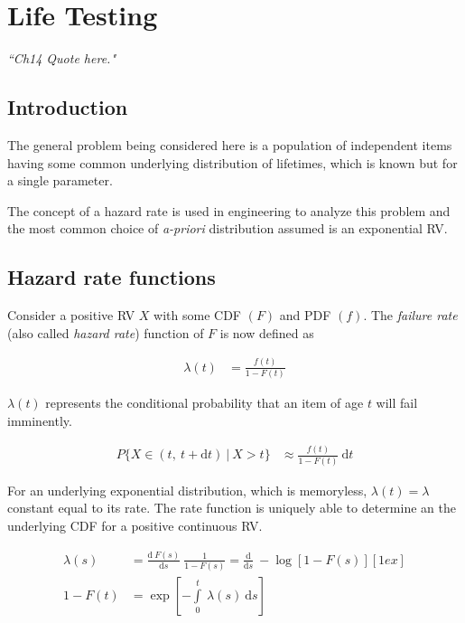 \chapter{Life Testing}


\begin{flushright}
	\textit{``Ch14 Quote here."} \\
\end{flushright}

\section{Introduction}

The general problem being considered here is a population of independent items having some common underlying distribution of lifetimes, which is known but for a single parameter.

The concept of a hazard rate is used in engineering to analyze this problem and the most common choice of \textit{a-priori} distribution assumed is an exponential RV.

\section{Hazard rate functions}

Consider a positive RV $ X $ with some CDF $ (F) $ and PDF $ (f) $. The \textit{failure rate} (also called \textit{hazard rate}) function of $ F $ is now defined as

\begin{align}
	\lambda(t) &= \frac{f(t)}{1 - F(t)}
\end{align}

$ \lambda(t) $ represents the conditional probability that an item of age $ t $ will fail imminently.

\begin{align}
	P \{ X \in (t,\ t +\mathrm{d}t)\ |\ X > t \} &\approx \frac{f(t)}{1 - F(t)}\ \mathrm{d}t
\end{align}

For an underlying exponential distribution, which is memoryless, $ \lambda(t) = \lambda $ constant equal to its rate. The rate function is uniquely able to determine an the underlying CDF for a positive continuous RV.

\begin{align}
	\lambda(s) &= \frac{\mathrm{d}\ F(s)}{\mathrm{d}s}\ \frac{1}{1 - F(s)} = \frac{\mathrm{d}}{\mathrm{d}s}\ -\log \left[ 1 - F(s) \right] [1ex] \\[1ex]
	1 - F(t) &= \exp\left[ -\int\limits_{0}^{t}\ \lambda(s)\ \mathrm{d}s \right]
\end{align}

